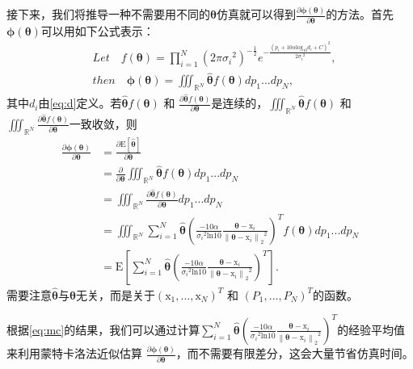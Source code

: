 接下来，我们将推导一种不需要用不同的$\bm\theta$仿真就可以得到${\frac{\partial\bm\phi(\bm{\theta})}{\partial \bm\theta}}$的方法。首先 $\bm\phi(\bm{\theta})$可以用如下公式表示：
\begin{equation}
\begin{split}
&Let \quad f(\bm{\theta}) = {\prod\limits_{i=1}^N}(2\pi{\sigma_i}^2)^{-\frac{1}{2}}e^{-\frac{(p_i + 10\alpha\mathrm{log}_{10}{d_i} + C)^2}{2{\sigma_i}^2}},\\
&then \quad \bm\phi(\bm{\theta}) = \iiint_{\mathbb{R}^N}\widehat{\bm{\theta}}f(\bm{\theta})dp_1...dp_N,
\end{split}
\end{equation}
其中$d_i$由\eqref{eq:d}定义。若$\widehat{\bm{\theta}}f(\bm{\theta})$ 和 $\frac{\partial \widehat{\bm{\theta}}f(\bm\theta)}{\partial \bm{\theta}}$是连续的，$\iiint_{\mathbb{R}^N}\widehat{\bm{\theta}}f(\bm\theta)$ 和 $\iiint_{\mathbb{R}^N}\frac{\partial \widehat{\bm{\theta}}f(\bm\theta)}{\partial \bm{\theta}}$一致收敛，则
\begin{equation}
\begin{split}
{\frac{\partial\bm\phi(\bm{\theta})}{\partial \bm\theta}} &= \frac{\partial\mathrm{E}[\widehat{\bm{\theta}}]}{\partial \bm{\theta}}\\
&= \frac{\partial}{\partial \bm{\theta}}\iiint_{\mathbb{R}^N} \widehat{\bm{\theta}}f(\bm{\theta}) dp_1...dp_N\\
&= \iiint_{\mathbb{R}^N} \frac{\partial \widehat{\bm{\theta}}f(\bm{\theta})}{\partial \bm{\theta}} dp_1...dp_N\\
&= \iiint_{\mathbb{R}^N} \sum\limits_{i=1}^N \widehat{\bm{\theta}}(\frac{-10\alpha}{{\sigma_i}^2\mathrm{ln}10}\frac{{\bm\theta} - \bm{\mathrm{x}}_i}{{\left\|{\bm\theta} - \bm{\mathrm{x}}_i\right\|_2}^2})^Tf(\bm{\theta}) dp_1...dp_N\\
&= \mathrm{E}[\sum\limits_{i=1}^N\widehat{\bm{\theta}}(\frac{-10\alpha}{{\sigma_i}^2\mathrm{ln}10}\frac{{\bm\theta} - \bm{\mathrm{x}}_i}{{\left\|{\bm\theta} - \bm{\mathrm{x}}_i\right\|_2}^2})^T]. \label{eq:mc}
\end{split}
\end{equation}
需要注意$\widehat{\bm{\theta}}$与$\bm{\theta}$无关，而是关于$(\bm{\mathrm{x}}_1,...,\bm{\mathrm{x}}_N)^T$ 和 $(P_1,...,P_N)^T$的函数。

根据\eqref{eq:mc}的结果，我们可以通过计算$\sum\limits_{i=1}^N\widehat{\bm{\theta}}(\frac{-10\alpha}{{\sigma_i}^2\mathrm{ln}10}\frac{{\bm\theta} - \bm{\mathrm{x}}_i}{{\left\|{\bm\theta} - \bm{\mathrm{x}}_i\right\|_2}^2})^T$的经验平均值来利用蒙特卡洛法近似估算 ${\frac{\partial\bm\phi(\bm{\theta})}{\partial \bm\theta}}$，而不需要有限差分，这会大量节省仿真时间。

